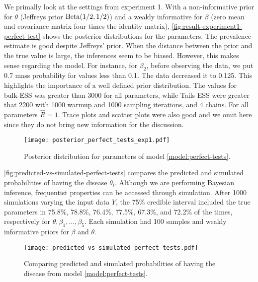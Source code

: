 We primally look at the settings from experiment 1. With a non-informative prior for $\theta$
(Jeffreys prior $\operatorname{Beta}(1/2, 1/2)$) and a weakly informative for $\beta$
(zero mean and covariance matrix four times the identity matrix),
\autoref{fig:result-experiment1-perfect-test} shows the posterior
distributions for the parameters. The prevalence estimate is good despite
Jeffreys' prior. When the distance between the prior and the true value is large, the
inferences seem to be biased. However, this makes sense regarding the model. For
instance, for $\beta_2$, before observing the data, we put 0.7 mass probability
for values less than 0.1. The data decreased it to 0.125. This highlights
the importance of a well defined prior distribution. The values for bulk-ESS
was greater than 3000 for all parameters, while Tails ESS were greater that
2200 with 1000 warmup and 1000 sampling iterations, and 4 chains. For all
parameters $\hat{R} = 1$. Trace plots and scatter plots were also good and we
omit here since they do not bring new information for the discussion.

\begin{figure}[!ht]
  \centering
  \caption{\label{fig:result-experiment1-perfect-test}Posterior
    distribution for parameters of model \eqref{model:perfect-tests}.}
  \texttt{[image: posterior\_perfect\_tests\_exp1.pdf]}
\end{figure}

\autoref{fig:predicted-vs-simulated-perfect-tests} compares the predicted and
simulated probabilities of having the disease $\theta_i$. Although we are performing Bayesian inference, frequentist properties can be
accessed through simulation. After 1000 simulations varying the input data
$Y$, the 75\% credible interval included the true parameters in 75.8\%, 78.8\%,
76.4\%, 77.5\%, 67.3\%, and 72.2\% of the times, respectively for $\theta,
  \beta_1, \dots, \beta_5$. Each simulation had 100 samples and weakly
informative priors for $\beta$ and $\theta$.

\begin{figure}[!ht]
  \centering
  \caption{\label{fig:predicted-vs-simulated-perfect-tests}Comparing predicted
    and simulated probabilities of having the disease from model \eqref{model:perfect-tests}.}
  \texttt{[image: predicted-vs-simulated-perfect-tests.pdf]}
\end{figure}

